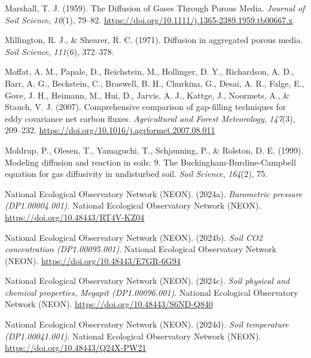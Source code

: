 \documentclass[
  letterpaper,
  DIV=11,
  numbers=noendperiod]{scrartcl}
\newlength{\cslhangindent}
\newenvironment{CSLReferences}[2] %
 {\begin{list}{}{%
  \setlength{\itemindent}{0pt}
  \setlength{\leftmargin}{0pt}
  \setlength{\parsep}{0pt}
  \ifodd #1
   \setlength{\leftmargin}{\cslhangindent}
   \setlength{\itemindent}{-1\cslhangindent}
  \fi
  \setlength{\itemsep}{#2\baselineskip}}}
 {\end{list}}
\begin{document}
\begin{CSLReferences}{1}{0}
Marshall, T. J. (1959). The {Diffusion} of {Gases Through Porous Media}.
\emph{Journal of Soil Science}, \emph{10}(1), 79--82.
\url{https://doi.org/10.1111/j.1365-2389.1959.tb00667.x}

Millington, R. J., \& Shearer, R. C. (1971). Diffusion in aggregated
porous media. \emph{Soil Science}, \emph{111}(6), 372--378.

Moffat, A. M., Papale, D., Reichstein, M., Hollinger, D. Y., Richardson,
A. D., Barr, A. G., Beckstein, C., Braswell, B. H., Churkina, G., Desai,
A. R., Falge, E., Gove, J. H., Heimann, M., Hui, D., Jarvis, A. J.,
Kattge, J., Noormets, A., \& Stauch, V. J. (2007). Comprehensive
comparison of gap-filling techniques for eddy covariance net carbon
fluxes. \emph{Agricultural and Forest Meteorology}, \emph{147}(3),
209--232. \url{https://doi.org/10.1016/j.agrformet.2007.08.011}

Moldrup, P., Olesen, T., Yamaguchi, T., Schjønning, P., \& Rolston, D.
E. (1999). Modeling diffusion and reaction in soils: 9. {The
Buckingham-Burdine-Campbell} equation for gas diffusivity in undisturbed
soil. \emph{Soil Science}, \emph{164}(2), 75.

National Ecological Observatory Network (NEON). (2024a).
\emph{Barometric pressure ({DP1}.00004.001)}. National Ecological
Observatory Network (NEON). \url{https://doi.org/10.48443/RT4V-KZ04}

National Ecological Observatory Network (NEON). (2024b). \emph{Soil
{CO2} concentration ({DP1}.00095.001)}. National Ecological Observatory
Network (NEON). \url{https://doi.org/10.48443/E7GR-6G94}

National Ecological Observatory Network (NEON). (2024c). \emph{Soil
physical and chemical properties, {Megapit} ({DP1}.00096.001)}. National
Ecological Observatory Network (NEON).
\url{https://doi.org/10.48443/S6ND-Q840}

National Ecological Observatory Network (NEON). (2024d). \emph{Soil
temperature ({DP1}.00041.001)}. National Ecological Observatory Network
(NEON). \url{https://doi.org/10.48443/Q24X-PW21}


\end{CSLReferences}
\end{document}
